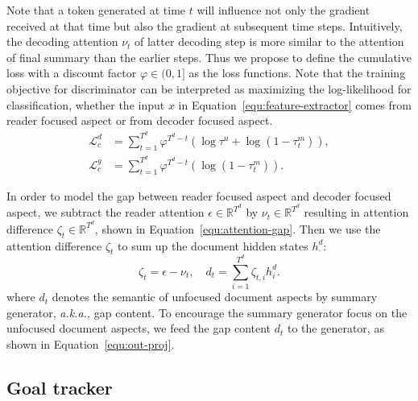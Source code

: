 \documentclass[letterpaper]{article} %
\newcommand{\aka}{\emph{a.k.a.,}\xspace}
\begin{document}
Note that a token generated at time $t$ will influence not only the gradient received at that time but also the gradient at subsequent time steps.
Intuitively, the decoding attention $\nu_t$ of latter decoding step is more similar to the attention of final summary than the earlier steps.
Thus we propose to define the cumulative loss with a discount factor $\varphi \in (0,1]$ as the loss functions.
Note that the training objective for discriminator can be interpreted as maximizing the log-likelihood for classification, whether the input $x$ in Equation~\ref{equ:feature-extractor} comes from reader focused aspect or from decoder focused aspect. 
\begin{align}
    \mathcal{L}^d_c &= \textstyle \sum^{T^d}_{t=1} \varphi^{T^d-t} (\log \tau^{u} + \log (1 - \tau^m_t)), \label{equ:dis-d}\\
    \mathcal{L}^g_c &= \textstyle \sum^{T^d}_{t=1} \varphi^{T^d-t} (\log (1 - \tau^m_t)). \label{equ:dis-c}
\end{align}

In order to model the gap between reader focused aspect and decoder focused aspect, we subtract the reader attention $\epsilon \in \mathbb{R}^{T^d}$ by $\nu_{t} \in \mathbb{R}^{T^d}$ resulting in attention difference $\zeta_t \in\mathbb{R}^{T^d}$, shown in Equation~\ref{equ:attention-gap}.
Then we use the attention difference $\zeta_t$ to sum up the document hidden states $h^d_{\cdot}$:
\begin{equation}
    \zeta_t = \epsilon - \nu_{t}, \label{equ:attention-gap} \quad
    d_t = \textstyle \sum^{T^d}_{i=1} \zeta_{t, i} h^d_i .
\end{equation}
where $d_t$ denotes the semantic of unfocused document aspects by summary generator, \aka gap content.
To encourage the summary generator focus on the unfocused document aspects, we feed the gap content $d_t$ to the generator, as shown in Equation~\ref{equ:out-proj}.

\subsection{Goal tracker} \label{sec:goal-tracker}
\end{document}
